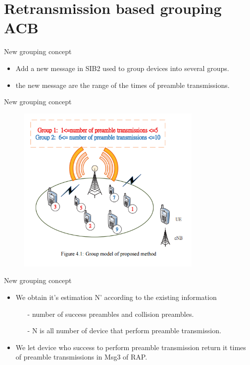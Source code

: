 \documentclass{beamer}
\begin{document}
\section{Retransmission based grouping ACB}
\begin{frame}{New grouping concept}
    \begin{itemize}
        \item Add a new message in SIB2 used to group devices into several groups.
        \item the new message are the range of the times of preamble transmissions.
    \end{itemize}
\end{frame}
\begin{frame}{New grouping concept}
    \begin{figure}[t]
        \centering
        \includegraphics[width=0.8\textwidth]{figures/4_1.png}
    \end{figure}
\end{frame}
\begin{frame}{New grouping concept}
    \begin{itemize}
        \item We obtain it's estimation N' according to the existing information
        \begin{itemize}
            \item[-] number of success preambles and collision preambles.
            \item[-] N is all number of device that perform preamble transmission.
        \end{itemize}
        \item We let device who success to perform preamble transmission return it times of preamble transmissions in Msg3 of RAP.
    \end{itemize}
    
\end{frame}
\end{document}
